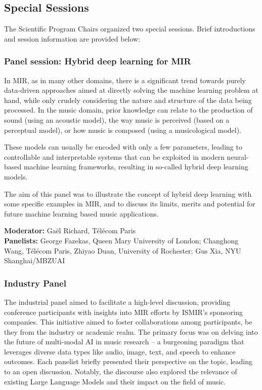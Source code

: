 \subsection*{Special Sessions}

The Scientific Program Chairs organized two special sessions.  Brief introductions and session information are provided below: 

\subsubsection*{Panel session: Hybrid deep learning for MIR}
    
In MIR, as in many other domains, there is a significant trend towards purely data-driven approaches aimed at directly solving the machine learning problem at hand, while only crudely considering the nature and structure of the data being processed.  In the music domain, prior knowledge can relate to the production of sound (using an acoustic model), the way music is perceived (based on a perceptual model), or how music is composed (using a musicological model).

These models can usually be encoded with only a few parameters, leading to controllable and interpretable systems that can be exploited in modern neural-based machine learning frameworks, resulting in so-called hybrid deep learning models.

The aim of this panel was to illustrate the concept of hybrid deep learning with some specific examples in MIR, and to discuss its limits, merits and potential for future machine learning based music applications.

\textbf{Moderator:} Gaël Richard, Télécom Paris \\
\textbf{Panelists:} George Fazekas, Queen Mary University of London; Changhong Wang, Télécom Paris, Zhiyao Duan, University of Rochester; Gus Xia, NYU Shanghai/MBZUAI

\subsubsection*{Industry Panel}

The industrial panel aimed to facilitate a high-level discussion, providing conference participants with insights into MIR efforts by ISMIR's sponsoring companies. This initiative aimed to foster collaborations among participants, be they from the industry or academic realm. The primary focus was on delving into the future of multi-modal AI in music research -- a burgeoning paradigm that leverages diverse data types like audio, image, text, and speech to enhance outcomes. Each panelist briefly presented their perspective on the topic, leading to an open discussion. Notably, the discourse also explored the relevance of existing Large Language Models and their impact on the field of music.

